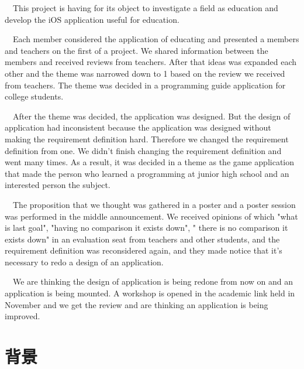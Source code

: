 \documentclass[openany,11pt,papersize]{jsbook}
\newcounter{hoge}
\newcommand{\fake}[1]{\whiledo{\thehoge<70}{#1\stepcounter{hoge}}%
  \setcounter{hoge}{0}}
\begin{document}
\begin{eabstract} 
　This project is having for its object to investigate a field as education and develop the iOS application useful for education.

　Each member considered the application of educating and presented a members and teachers on the first of a project. We shared information between the members and received reviews from teachers. After that ideas was expanded each other and the theme was narrowed down to 1 based on the review we received from teachers. The theme was decided in a programming guide application for college students.

　After the theme was decided, the application was designed. But the design of application had inconsistent because the application was designed without making the requirement definition hard. Therefore we changed the requirement definition from one. We didn't finish changing the requirement definition and went many times. As a result, it was decided in a theme as the game application that made the person who learned a programming at junior high school and an interested person the subject.

　The proposition that we thought was gathered in a poster and a poster session was performed in the middle announcement. We received opinions of which "what is last goal", "having no comparison it exists down", " there is no comparison it exists down" in an evaluation seat from teachers and other students, and the requirement definition was reconsidered again, and they made notice that it's necessary to redo a design of an application.

　We are thinking the design of application is being redone from now on and an application is being mounted. A workshop is opened in the academic link held in November and we get the review and are thinking an application is being improved. 
\end{eabstract}

\tableofcontents%


\mainmatter%

\chapter{背景}
\end{document}
